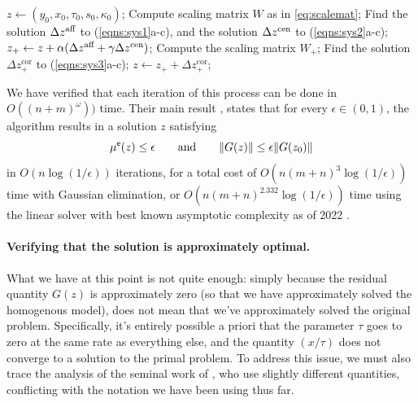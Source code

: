 \begin{subappendices}
\begin{lproof}
    \begin{algorithm}
        \caption{~[\citeauthor*{badenbroek2021algorithm}]}
        \label{algo:dahl-primal-dual}
        \singlespacingplus
    \begin{algorithmic}
        \STATE $z \gets (y_0, x_0, \tau_0, s_0, \kappa_0)$;
        \WHILE{}
            \STATE Compute scaling matrix $W$ as in \eqref{eq:scalemat};
            \STATE Find the solution $\Delta {z}^{\text{aff}}$ to (\ref{eqns:sys1}a-c),
                and the solution $\Delta {z}^{\text{cen}}$ to (\ref{eqns:sys2}a-c);
            \STATE $z_+ \gets z + \alpha (\Delta {z}^{\text{aff}} + \gamma \Delta {z}^{\text{cen}})$;
            \STATE Compute the scaling matrix $W_+$;
            \STATE Find the solution $\Delta z^{\text{cor}}_+$ to (\ref{eqns:sys3}a-c);
            \STATE $z \gets z_+ + \Delta z_+^{\text{cor}}$;
        \ENDWHILE
    \end{algorithmic}
    \end{algorithm}

    We have verified that each iteration of this process can be done in $O((n+m)^\omega))$ time.
    Their main result \parencite[Theorem 3]{badenbroek2021algorithm}, states that for every $\epsilon \in (0,1)$,
    the algorithm results in a solution $z$ satisfying
    \[
        \mu^{\sf e}(z)
        \le \epsilon
        \qquad \text{and}\qquad
        \Vert G(z) \Vert \le \epsilon
            \Vert G(z_0) \Vert
    \]
    in $O(n \log (1/\epsilon))$ iterations,
    for a total cost of
    $O(n (m+n)^3 \log (1/\epsilon) )$ time with Gaussian elimination, or
    $O(n (m+n)^{2.332} \log (1/\epsilon) )$ time using the linear solver with best
         known asymptotic complexity as of 2022 \cite{duan2022faster}.


    \paragraph{Verifying that the solution is approximately optimal.}
    What we have at this point is not quite enough: simply because the residual quantity $G(z)$ is approximately zero (so that we have approximately solved the homogenous model), does not mean that we've approximately solved the original problem.
    Specifically, it's entirely possible a priori that the parameter $\tau$ goes to zero at the same rate as everything else, and the quantity $(x/\tau)$ does not converge to a solution to the primal problem.
    To address this issue, we must also trace the analysis of the seminal work of \textcite{nesterov1996infeasible}, who use slightly different quantities, conflicting with the notation we have been using thus far.



\end{lproof}
\end{subappendices}
